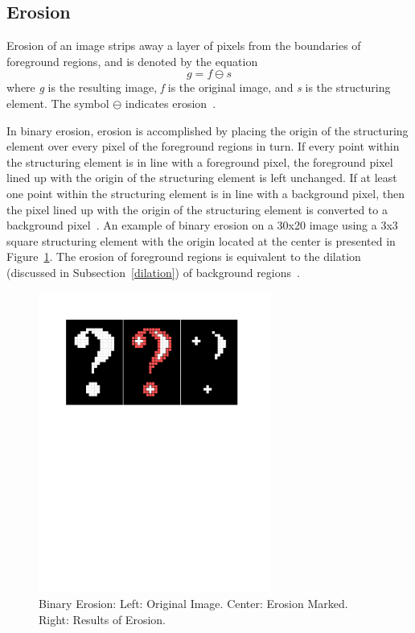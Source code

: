 \documentclass{sig-alternate}
\begin{document}
\subsection{Erosion}\label{erosion}
Erosion of an image strips away a layer of pixels from the boundaries of foreground regions, and is denoted by the equation
\begin{equation*}
g = f \ominus s
\end{equation*}
where \textit{g} is the resulting image, \textit{f} is the original image, and \textit{s} is the structuring element. The symbol $\ominus$ indicates erosion~\cite{MorphologyWikiAnonymous, MorphologyBook:2000}.

In binary erosion, erosion is accomplished by placing the origin of the structuring element over every pixel of the foreground regions in turn. If every point within the structuring element is in line with a foreground pixel, the foreground pixel lined up with the origin of the structuring element is left unchanged. If at least one point within the structuring element is in line with a background pixel, then the pixel lined up with the origin of the structuring element is converted to a background pixel~\cite{MorphologyWiki}. An example of binary erosion on a 30x20 image using a 3x3 square structuring element with the origin located at the center is presented in Figure~\ref{binary erosion figure}. The erosion of foreground regions is equivalent to the dilation (discussed in Subsection~\ref{dilation}) of background regions~\cite{MorphologyWiki}.
\begin{figure}
\centering
\includegraphics[width=3in,trim={0 6.75in 0 0},clip]{erosion}
\caption{Binary Erosion: Left: Original Image. Center: Erosion Marked. Right: Results of Erosion.}
\label{binary erosion figure}
\end{figure}
\end{document}
